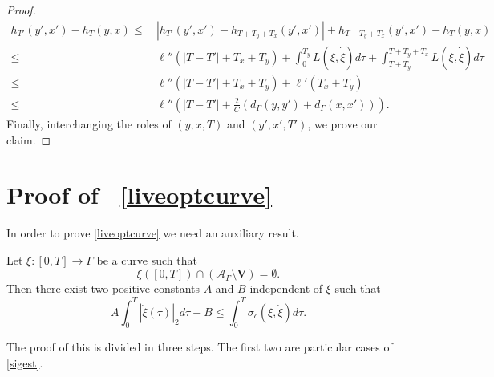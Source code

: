 \documentclass[11pt,a4paper,american]{article}
\newcommand{\Acal}{\mathcal A}
\newcommand{\Vbf}{\mathbf V}
\newcommand{\ovxi}{\overline\xi}
\begin{document}
\begin{proof}
        \begin{align*}
            h_{T'}\left(y',x'\right)-h_T(y,x)\le&\,\left|h_{T'}\left(y',x'\right)-h_{T+T_y+T_x}\left(y',x'\right)\right|+h_{T+T_y+T_x}\left(y',x'\right)-h_T(y,x)\\
            \le&\,\ell''\left(\left|T-T'\right|+T_x+T_y\right)+\int_0^{T_y}L\left(\ovxi,\dot\ovxi\right)d\tau+\int_{T+T_y}^{T+T_y+T_x}L\left(\ovxi,\dot\ovxi\right)d\tau\\
            \le&\,\ell''\left(\left|T-T'\right|+T_x+T_y\right)+\ell'(T_x+T_y)\\
            \le&\,\ell''\left(\left|T-T'\right|+\frac2C\left(d_\Gamma\left(y,y'\right)+d_\Gamma\left(x,x'\right)\right)\right).
        \end{align*}
        Finally, interchanging the roles of $(y,x,T)$ and $(y',x',T')$, we prove our claim.
    \end{proof}

    \section{Proof of ~\ref{liveoptcurve}}\label{curvecostsec}

    In order to prove \cref{liveoptcurve} we need an auxiliary result.

    \begin{lem}\label{sigest}
        Let $\xi:[0,T]\to\Gamma$ be a curve such that
        \begin{equation}\label{eq:sigest.1}
            \xi([0,T])\cap(\Acal_\Gamma\setminus\Vbf)=\emptyset.
        \end{equation}
        Then there exist two positive constants $A$ and $B$ independent of $\xi$ such that
        \begin{equation}\label{eq:sigest.2}
            A\int_0^T\left|\dot\xi(\tau)\right|_2d\tau-B\le\int_0^T\sigma_c\left(\xi,\dot\xi\right)d\tau.
        \end{equation}
    \end{lem}

    The proof of this  is divided in three steps. The first two are particular cases of \cref{sigest}.
\end{document}
